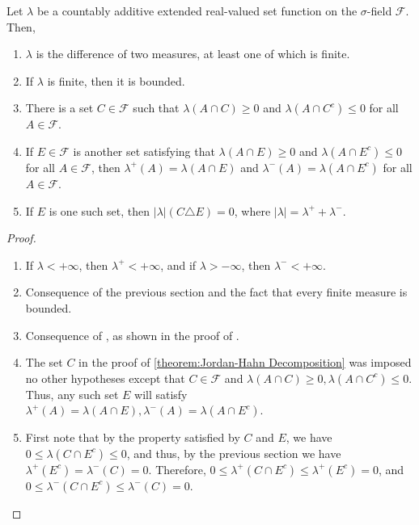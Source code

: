 \begin{corl} Let \(\lambda\) be a countably additive extended real-valued
set function on the \(\sigma\)-field \(\mathcal{F}\). Then,
	\begin{enumerate}
		\item \(\lambda\) is the difference of two measures, at least one of
which is finite.
		\item If \(\lambda\) is finite, then it is bounded.
		\item \label{corollary:positive set of a signed measure} There is a set
\(C\in\mathcal{F}\) such that \(\lambda(A\cap C)\geq0\) and \(\lambda(A\cap C^c)\leq0\)
for all \(A\in\mathcal{F}\).
		\item If \(E\in\mathcal{F}\) is another set satisfying that
\(\lambda(A\cap E)\geq0\) and \(\lambda(A\cap E^c)\leq0\) for all \(A\in\mathcal{F}\),
then \(\lambda^+(A)=\lambda(A\cap E)\) and \(\lambda^-(A)=\lambda(A\cap E^c)\)
for all \(A\in\mathcal{F}\).
		\item \label{corollary:positive set of a signed measure is its positive
part}If \(E\) is one such set, then \(\left|\lambda\right|(C\triangle E)=0\),
where \(\left|\lambda\right|=\lambda^++\lambda^-\).
	\end{enumerate}
\end{corl}
\begin{proof}
	\begin{enumerate}
		\item If \(\lambda<+\infty\), then \(\lambda^+<+\infty\), and if
\(\lambda>-\infty\), then \(\lambda^-<+\infty\).
		\item Consequence of the previous section and the fact that every finite
measure is bounded.
		\item Consequence of , as shown in the proof of .
		\item The set \(C\) in the proof of \ref{theorem:Jordan-Hahn
Decomposition} was imposed no other hypotheses except that \(C\in\mathcal{F}\) and
\(\lambda(A\cap C)\geq0, \lambda(A\cap C^c)\leq0\). Thus, any such set \(E\)
will satisfy \(\lambda^+(A)=\lambda(A\cap E), \lambda^-(A)=\lambda(A\cap E^c)\).
		\item First note that by the property satisfied by \(C\) and \(E\), we
have \(0\leq\lambda(C\cap E^c)\leq0\), and thus, by the previous section we have
\(\lambda^+(E^c)=\lambda^-(C)=0\).  Therefore,
\(0\leq\lambda^+(C\cap E^c)\leq\lambda^+(E^c)=0\), and
\(0\leq\lambda^-(C\cap E^c)\leq\lambda^-(C)=0\).
	\end{enumerate}
\end{proof}


